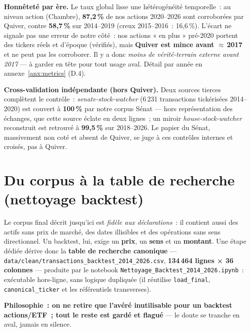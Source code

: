 \documentclass[11pt,a4paper]{article}
\newcommand{\co}[1]{\texttt{\small #1}}
\begin{document}
\textbf{Honnêteté par ère.} Le taux global lisse une hétérogénéité temporelle~: au niveau action (Chambre),
\textbf{87,2\,\%} de nos actions 2020--2026 sont corroborées par Quiver, contre \textbf{58,7\,\%} sur
2014--2019 (creux 2015--2016~: 16,6\,\%). L'écart ne signale pas une erreur de notre côté~: nos actions
« en plus » pré-2020 portent des tickers réels et d'époque (vérifiés), mais \textbf{Quiver est mince avant
$\approx$\,2017} et ne peut pas les corroborer. Il y a donc \emph{moins de vérité-terrain externe avant
2017} — à garder en tête pour tout usage aval. Détail par année en annexe~\ref{anx:metrics} (D.4).

\textbf{Cross-validation indépendante (hors Quiver).} Deux sources tierces complètent le contrôle~:
\emph{senate-stock-watcher} (6\,231 transactions tickérisées 2014--2020) est couvert à \textbf{100\,\%}
par notre corpus Sénat — hors représentation des échanges, que cette source éclate en deux lignes~; un
miroir \emph{house-stock-watcher} reconstruit est retrouvé à \textbf{99,5\,\%} sur 2018--2026. Le papier du
Sénat, massivement non coté et absent de Quiver, se juge à ces contrôles internes et croisés, pas à Quiver.

\section{Du corpus à la table de recherche (nettoyage backtest)}
\label{sec:nettoyage}

Le corpus final décrit jusqu'ici est \emph{fidèle aux déclarations}~: il contient aussi des actifs sans
prix de marché, des dates illisibles et des opérations sans sens directionnel. Un backtest, lui, exige un
\textbf{prix}, un \textbf{sens} et un \textbf{montant}. Une étape dédiée dérive donc la \textbf{table de
recherche canonique} — \co{data/clean/transactions_backtest_2014_2026.csv}, \textbf{134\,464 lignes × 36
colonnes} — produite par le notebook \co{Nettoyage_Backtest_2014_2026.ipynb}~: exécutable hors-ligne, sans
logique dupliquée (il réutilise \co{load_final}, \co{canonical_ticker} et les référentiels transverses).

\textbf{Philosophie~: on ne retire que l'avéré inutilisable pour un backtest actions/ETF~; tout le reste
est gardé et flagué} — le doute se tranche en aval, jamais en silence.
\end{document}
